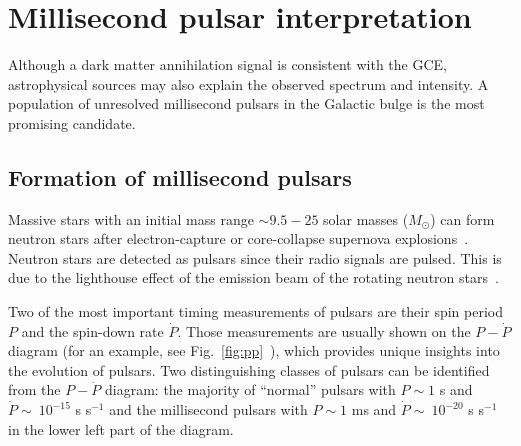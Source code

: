 \documentclass[doublespace,nopageskip]{VTthesis}
\begin{document}


\section{Millisecond pulsar interpretation}\label{se:GCEmsp}

Although a dark matter annihilation signal is consistent with the GCE,  astrophysical sources may also explain the observed spectrum and intensity. A population of unresolved millisecond pulsars in the Galactic bulge is the most promising candidate.

\subsection{Formation of millisecond pulsars}

Massive stars with an initial mass range $\sim 9.5 - 25$ solar masses ($M_\odot$) can form neutron stars after electron-capture or core-collapse supernova explosions~\cite{2014PASA...31...30K}. Neutron stars are detected as pulsars since their radio signals are pulsed. This is due to the lighthouse effect of the emission beam of the rotating neutron stars~\cite{2004hpa..book.....L}.

Two of the most important timing measurements of pulsars are their spin period $P$ and the spin-down rate $\dot{P}$. Those measurements are usually shown on the $P-\dot{P}$ diagram (for an example, see Fig.~\ref{fig:pp}~\cite{2011AIPC.1357..269T,2005AJ....129.1993M}), which provides unique insights into the evolution of pulsars. Two distinguishing classes of pulsars can be identified from the $P-\dot{P}$ diagram: the majority of ``normal'' pulsars with $P \sim 1$ s and $\dot{P} \sim\ 10^{-15}$ s s$^{-1}$ and the millisecond pulsars  with $P \sim 1$ ms and $\dot{P} \sim\ 10^{-20}$ s s$^{-1}$ in the lower left part of the diagram.
\end{document}
